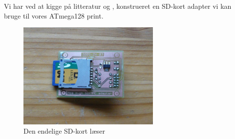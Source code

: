 Vi har ved at kigge på litteratur \cite{web:captain-mmc} og
\cite{web:sd-pinout}, konstrueret en SD-kort adapter vi kan bruge til
vores ATmega128 print.

\begin{figure}[htbp]
  \centering
  \includegraphics[width=7cm]{./img/sd-adapter}
  \caption{Den endelige SD-kort læser}
  \label{fig:sd-adapter}
\end{figure}




